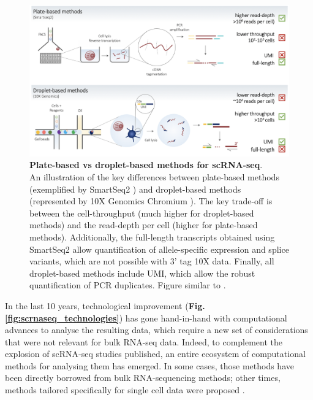 \begin{figure}[h]
\centering
\includegraphics[width=16cm]{Chapter3/Fig/plate_vs_droplet.png}
\caption[scRNA-seq plate vs droplet]{\textbf{Plate-based vs droplet-based methods for scRNA-seq}.\\
An illustration of the key differences between plate-based methods (exemplified by SmartSeq2 \cite{picelli2013smart}) and droplet-based methods (represented by 10X Genomics Chromium \cite{zheng2017massively}).
The key trade-off is between the cell-throughput (much higher for droplet-based methods) and the read-depth per cell (higher for plate-based methods).
Additionally, the full-length transcripts obtained using SmartSeq2 allow quantification of allele-specific expression and splice variants, which are not possible with 3' tag 10X data.
Finally, all droplet-based methods include UMI, which allow the robust quantification of PCR duplicates.
Figure similar to \cite{griffiths2018using}.}
\label{fig:scrnaseq_plate_vs_droplet}
\end{figure}


In the last 10 years, technological improvement (\textbf{Fig. \ref{fig:scrnaseq_technologies}}) has gone hand-in-hand with computational advances to analyse the resulting data, which require a new set of considerations that were not relevant for bulk RNA-seq data.
Indeed, to complement the explosion of scRNA-seq studies published, an entire ecosystem of computational methods for analysing them has emerged.
In some cases, those methods have been directly borrowed from bulk RNA-sequencing methods; other times, methods tailored specifically for single cell data were proposed \cite{stegle2015computational, zappia2018exploring, luecken2019current}.

